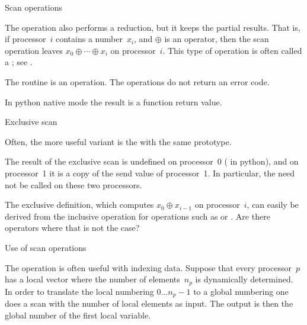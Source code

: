 
 {Scan operations}

\label{sec:scan}

The  operation also performs a reduction, but it keeps 
the partial results. That is, if processor~$i$ contains a number~$x_i$, 
and $\oplus$ is an operator,
then the scan operation leaves $x_0\oplus\cdots\oplus x_i$ on processor~$i$.
This type of operation is often called a ;
see .

The  routine is an  operation.
%
%
The  operations do not return an error code.

In python native mode the result is a function return value.
%

 {Exclusive scan}

Often, the more useful variant is the 
%
%
with the same prototype. 

The result of the exclusive scan is undefined on processor~0
( in python),
and on processor~1 it is a copy of the send value of processor~1.
In particular, the  need not be called on these two 
processors.

\begin{exercise}
  The exclusive definition, which computes
  $x_0\oplus x_{i-1}$ on processor~$i$, can easily be derived
  from the inclusive operation for operations such as  or .
  Are there operators where that is not the case?
\end{exercise}

 {Use of scan operations}

The  operation is often useful with indexing data. Suppose that
every processor~$p$ has a local vector where the number of elements~$n_p$ is dynamically 
determined. In order to translate the local numbering $0\ldots n_p-1$ to a global numbering
one does a scan with the number of local elements as input. The output is then the global 
number of the first local variable.

